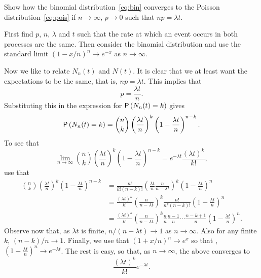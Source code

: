 \begin{exercise}
  Show how the binomial distribution~\eqref{eq:bin} converges to the
  Poisson distribution~\eqref{eq:pois} if $n\to\infty$, $p\to0$ such
  that $n p=\lambda t$. 
  \begin{hint}
First find $p$, $n$, $\lambda$ and $t$ such that the rate
    at which an event occurs in both processes are the same. Then consider
    the binomial distribution and use the standard limit
    $(1-x/n)^n \to e^{-x}$ as $n\to \infty$. 
  \end{hint}
  \begin{solution} Now we like to relate $N_n(t)$ and $N(t)$. It is
    clear that we at least want the expectations to be the same, that
    is, $n p = \lambda t$. This implies that
\begin{equation*}
  p = \frac{\lambda t}n.
\end{equation*}
Substituting this in the expression for $\P{N_n(t)=k}$ gives
\begin{equation*}
  \P{N_n(t) = k} = {n \choose k} \left(\frac{\lambda t}{n}\right)^k \left(1-\frac{\lambda t}n\right)^{n-k}.
\end{equation*}
To see that 
\begin{equation*}\label{eq:52}
  \lim_{n\to\infty} {n \choose k} \left(\frac{\lambda t}{n}\right)^k \left(1-\frac{\lambda t}n\right)^{n-k} = e^{-\lambda t} \frac{(\lambda t)^k}{k!},
\end{equation*}
use that
    \begin{align*}
      {n \choose k} \left(\frac{\lambda t}{n}\right)^k \left(1-\frac{\lambda t}n\right)^{n-k} 
&= \frac{n!}{k!(n-k)!} \left(\frac{\lambda t}{n}\frac{n}{n-\lambda t}\right)^k \left(1-\frac{\lambda t}n\right)^{n} \\
&= \frac{(\lambda t)^k}{k!} \left(\frac n{n-\lambda t} \right)^k  \frac{n!}{n^k(n-k)!}\left(1-\frac{\lambda t}n\right)^{n}\\
&= \frac{(\lambda t)^k}{k!} \left(\frac n{n-\lambda t} \right)^k \frac{n}{n}\frac{n-1}{n}\cdots\frac{n-k+1}{n} \left(1-\frac{\lambda t}n\right)^{n}.
\end{align*}
Observe now that, as $\lambda t$ is finite, $n/(n-\lambda t)\to 1$ as
$n\to \infty$. Also for any finite $k$, $(n-k)/n\to1$. Finally, we use
that $(1+x/n)^n\to e^{x}$ so that ,
$\left(1-\frac{\lambda t}n\right)^{n} \to e^{-\lambda t}$.  The rest
is easy, so that, as $n\to\infty$,  the above converges to 
\begin{equation*}
\frac{(\lambda t)^k}{k!} e^{-\lambda t}.
\end{equation*}

  \end{solution}
\end{exercise}

